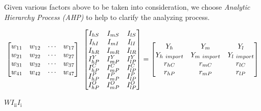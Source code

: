 \documentclass{mcmthesis}
\begin{document}
    Given various factors above to be taken into consideration, we choose \textit{Analytic Hierarchy Process (AHP)} to help to clarify the analyzing process.
\begin{spacing}{1.4}
\begin{equation}
 \begin{bmatrix}
   
   w_{11}&w_{12}&\cdots&w_{17}\\
   w_{21}&w_{22}&\cdots&w_{27}\\
   w_{31}&w_{32}&\cdots&w_{37}\\
   w_{41}&w_{42}&\cdots&w_{47}\\
 
  \end{bmatrix}
  \textcolor{white}{\cdot}
  \begin{bmatrix}
   I_{hS}&I_{mS}&I_{lS}\\
   I_{hI}&I_{mI}&I_{lI}\\
   I_{hR}&I_{mR}&I_{lR}\\
   I_{hP}^Y&I_{mP}^Y&I_{lP}^Y\\
   I_{hP}^C&I_{mP}^C&I_{lP}^C\\
   I_{hP}^P&I_{mP}^P&I_{lP}^P\\
   I_{hP}^O&I_{mP}^O&I_{lP}^O
  \end{bmatrix}
  =
  \begin{bmatrix}
	 Y_h&Y_m&Y_l\\
	 Y_{h\ import}&Y_{m\ import}&Y_{l\ import}\\
	 r_{hC}&r_{mC}&r_{lC}\\
	 r_{hP}&r_{mP}&r_{lP}
  \end{bmatrix}
  \end{equation}
   \end{spacing}
   \begin{spacing}{0}
  
     \qquad \qquad \qquad \quad \textbf{${W}$}\qquad \qquad \qquad \quad \quad \textbf{$I_{\textrm{ii}}$}\qquad \qquad \qquad \qquad \qquad \quad \textbf{$I_{\textrm{i}}$}
   \end{spacing}

 
   \hspace*{\fill} 
	  
\end{document}
